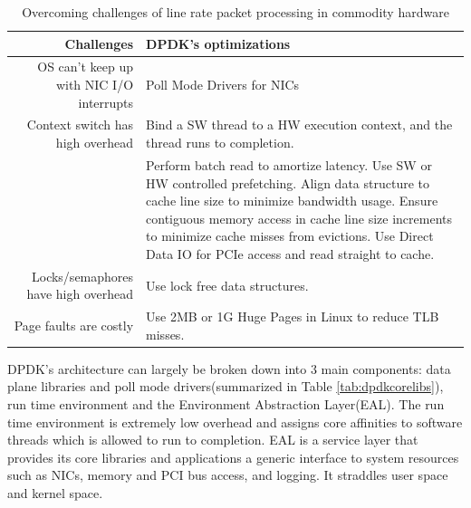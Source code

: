 \documentclass{sig-alternate-05-2015}
\begin{document}
\begin{table}[]
\centering
\caption{Overcoming challenges of line rate packet processing in commodity hardware}
\label{tab:dpdkchallenges}
\begin{tabular}{|r|p{4in}|}
\hline
\textbf{Challenges} & \textbf{DPDK's optimizations}                                                           \\ \hline
OS can't keep up with NIC I/O interrupts & Poll Mode Drivers for NICs                                                                    \\ \hline
Context switch has high overhead & Bind a SW thread to a HW execution context, and the thread runs to completion.                               \\ \hline
\centering{Memory \& PCIe access is slow} & Perform batch read to amortize latency. Use SW or HW controlled prefetching. Align data structure to cache line size to minimize bandwidth usage. Ensure contiguous memory access in cache line size increments to minimize cache misses from evictions. Use Direct Data IO for PCIe access and read straight to cache.\\ \hline
Locks/semaphores have high overhead & Use lock free data structures. \\ \hline
Page faults are costly & Use 2MB or 1G Huge Pages in Linux to reduce TLB misses. \\ \hline
\end{tabular}
\end{table}

DPDK's architecture can largely be broken down into 3 main components: data plane libraries and poll mode drivers(summarized in Table \ref{tab:dpdkcorelibs}), run time environment and the Environment Abstraction Layer(EAL). The run time environment is extremely low overhead and assigns core affinities to software threads which is allowed to run to completion. EAL is a service layer that provides its core libraries and applications a generic interface to system resources such as NICs, memory and PCI bus access, and logging. It straddles user space and kernel space. \cite{dpdk:programmerguide}
\end{document}
